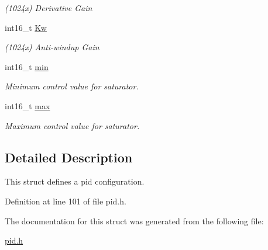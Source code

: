 \begin{DoxyCompactItemize}
\begin{DoxyCompactList}\small\item\em (1024x) Derivative Gain \end{DoxyCompactList}\item 
\hypertarget{structpid_1_1config_a45efd88239ac9cca3e50b30872ec60b0}{int16\-\_\-t \hyperlink{structpid_1_1config_a45efd88239ac9cca3e50b30872ec60b0}{Kw}}\label{structpid_1_1config_a45efd88239ac9cca3e50b30872ec60b0}

\begin{DoxyCompactList}\small\item\em (1024x) Anti-\/windup Gain \end{DoxyCompactList}\item 
\hypertarget{structpid_1_1config_aae6211003bdff958f96f383635050b6b}{int16\-\_\-t \hyperlink{structpid_1_1config_aae6211003bdff958f96f383635050b6b}{min}}\label{structpid_1_1config_aae6211003bdff958f96f383635050b6b}

\begin{DoxyCompactList}\small\item\em Minimum control value for saturator. \end{DoxyCompactList}\item 
\hypertarget{structpid_1_1config_a62ce3aa1fa016c1305ad6a3f96df2540}{int16\-\_\-t \hyperlink{structpid_1_1config_a62ce3aa1fa016c1305ad6a3f96df2540}{max}}\label{structpid_1_1config_a62ce3aa1fa016c1305ad6a3f96df2540}

\begin{DoxyCompactList}\small\item\em Maximum control value for saturator. \end{DoxyCompactList}\end{DoxyCompactItemize}


\subsection{Detailed Description}
This struct defines a pid configuration. 

Definition at line 101 of file pid.\-h.



The documentation for this struct was generated from the following file\-:\begin{DoxyCompactItemize}
\item 
\hyperlink{pid_8h}{pid.\-h}\end{DoxyCompactItemize}
